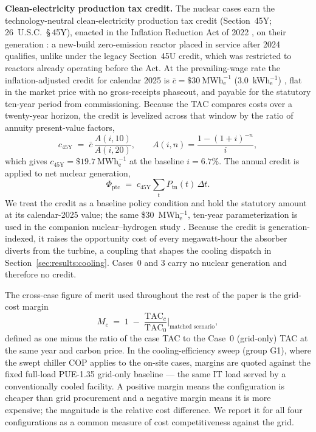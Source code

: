 \documentclass[sn-vancouver,Numbered]{sn-jnl}%
\newcommand{\runinhead}[1]{\par\smallskip\noindent\textbf{#1.}\quad}
\begin{document}
\runinhead{Clean-electricity production tax credit}
The nuclear cases earn the technology-neutral clean-electricity production tax credit (Section~45Y; 26~U.S.C.~\S\,45Y), enacted in the Inflation Reduction Act of 2022 \citep{ira2022}, on their generation \citep{usc26_45y,irs45y}: a new-build zero-emission reactor placed in service after 2024 qualifies, unlike under the legacy Section~45U credit, which was restricted to reactors already operating before the Act. At the prevailing-wage rate the inflation-adjusted credit for calendar 2025 is $\bar{c}=\$30~\mathrm{MWh}_\mathrm{e}^{-1}$ (3.0\textcent~kWh$_\mathrm{e}^{-1}$) \citep{fr2025_45y}, flat in the market price with no gross-receipts phaseout, and payable for the statutory ten-year period from commissioning. Because the TAC compares costs over a twenty-year horizon, the credit is levelized across that window by the ratio of annuity present-value factors,
\begin{equation}
\label{eq:ptc}
c_{45\mathrm{Y}} \;=\; \bar{c}\,\frac{A(i,10)}{A(i,20)}, \qquad A(i,n)=\frac{1-(1+i)^{-n}}{i},
\end{equation}
which gives $c_{45\mathrm{Y}}=\$19.7~\mathrm{MWh}_\mathrm{e}^{-1}$ at the baseline $i=6.7\%$. The annual credit is applied to net nuclear generation,
\begin{equation}
\label{eq:ptc_total}
\Phi_{\mathrm{ptc}} \;=\; c_{45\mathrm{Y}} \sum_t P_{\mathrm{tn}}(t)\,\Delta t.
\end{equation}
We treat the credit as a baseline policy condition and hold the statutory amount at its calendar-2025 value; the same \$30~MWh$_\mathrm{e}^{-1}$, ten-year parameterization is used in the companion nuclear--hydrogen study \citep{li2026nuclearH2}. Because the credit is generation-indexed, it raises the opportunity cost of every megawatt-hour the absorber diverts from the turbine, a coupling that shapes the cooling dispatch in Section~\ref{sec:results:cooling}. Cases~0 and 3 carry no nuclear generation and therefore no credit.

The cross-case figure of merit used throughout the rest of the paper is the grid-cost margin
\begin{equation}
\label{eq:margin}
M_c \;=\; 1 \;-\; \frac{\mathrm{TAC}_c}{\mathrm{TAC}_0}\Big|_{\text{matched scenario}},
\end{equation}
defined as one minus the ratio of the case TAC to the Case~0 (grid-only) TAC at the same year and carbon price. In the cooling-efficiency sweep (group G1), where the swept chiller COP applies to the on-site cases, margins are quoted against the fixed full-load PUE-1.35 grid-only baseline — the same IT load served by a conventionally cooled facility. A positive margin means the configuration is cheaper than grid procurement and a negative margin means it is more expensive; the magnitude is the relative cost difference. We report it for all four configurations as a common measure of cost competitiveness against the grid.
\end{document}
